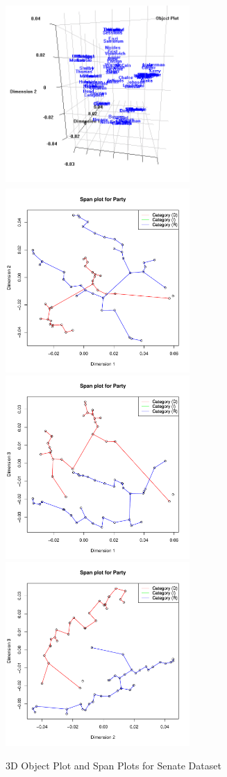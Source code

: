 \documentclass[article]{Z}
\begin{document}
\begin{figure}[h]
\begin{center}
\includegraphics[height=70mm, width=70mm]{senate.png}
\includegraphics[height=70mm, width=70mm]{senatespan12.pdf}
\includegraphics[height=70mm, width=70mm]{senatespan13.pdf}
\includegraphics[height=70mm, width=70mm]{senatespan23.pdf}
\caption{\label{fig:sen} 3D Object Plot and Span Plots for Senate Dataset}
\end{center}
\end{figure}
\end{document}
